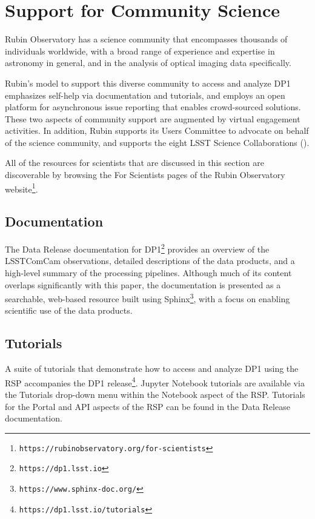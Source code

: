 \section{Support for Community Science}
\label{sec:community_science}

Rubin Observatory has a science community that encompasses thousands of individuals worldwide, with a broad range of experience and expertise in astronomy in general, and in the analysis of optical imaging data specifically.

Rubin's model to support this diverse community to access and analyze \gls{DP1} emphasizes self-help via documentation and tutorials, and employs an open platform for asynchronous issue reporting that enables crowd-sourced solutions.
These two aspects of community support are augmented by virtual engagement activities.
In addition, Rubin supports its Users Committee to advocate on behalf of the science community, and supports the eight \gls{LSST} Science Collaborations ().

All of the resources for scientists that are discussed in this section are discoverable by browsing the For Scientists pages of the Rubin Observatory website\footnote{\nolinkurl{https://rubinobservatory.org/for-scientists}}.

\subsection{Documentation}
\label{ssec:documentation}

The Data Release documentation for \gls{DP1}\footnote{\nolinkurl{https://dp1.lsst.io}} provides an overview of the \gls{LSSTComCam} observations, detailed descriptions of the data products, and a high-level summary of the processing pipelines. 
Although much of its content overlaps significantly with this paper, the documentation is presented as a searchable, web-based resource built using Sphinx\footnote{\nolinkurl{https://www.sphinx-doc.org/}}, with a focus on enabling scientific use of the data products.

\subsection{Tutorials}
\label{ssec:tutorials}

A suite of tutorials \citep{10.11578/rubin/dc.20250909.20} that demonstrate how to access and analyze \gls{DP1} using the RSP accompanies the \gls{DP1} release\footnote{\nolinkurl{https://dp1.lsst.io/tutorials}}.
Jupyter Notebook tutorials are available via the Tutorials drop-down menu within the Notebook aspect of the \gls{RSP}.
Tutorials for the Portal and API aspects of the \gls{RSP} can be found in the Data Release documentation.

